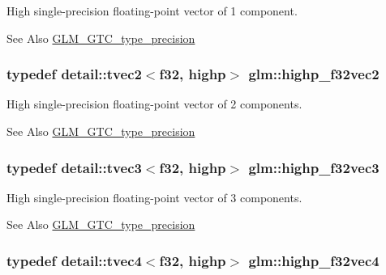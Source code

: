 High single-\/precision floating-\/point vector of 1 component. \begin{DoxySeeAlso}{See Also}
\hyperlink{group__gtc__type__precision}{G\-L\-M\-\_\-\-G\-T\-C\-\_\-type\-\_\-precision} 
\end{DoxySeeAlso}
\hypertarget{group__gtc__type__precision_gabba3e1b3ae0bcaa7aaac573c08c2f8d3}{
\subsubsection[{highp\-\_\-f32vec2}]{\setlength{\rightskip}{0pt plus 5cm}typedef detail\-::tvec2$<$f32, highp$>$ {\bf glm\-::highp\-\_\-f32vec2}}}\label{group__gtc__type__precision_gabba3e1b3ae0bcaa7aaac573c08c2f8d3}
High single-\/precision floating-\/point vector of 2 components. \begin{DoxySeeAlso}{See Also}
\hyperlink{group__gtc__type__precision}{G\-L\-M\-\_\-\-G\-T\-C\-\_\-type\-\_\-precision} 
\end{DoxySeeAlso}
\hypertarget{group__gtc__type__precision_ga581a4a4eb1f3a269d16af0c4e2d8daf4}{
\subsubsection[{highp\-\_\-f32vec3}]{\setlength{\rightskip}{0pt plus 5cm}typedef detail\-::tvec3$<$f32, highp$>$ {\bf glm\-::highp\-\_\-f32vec3}}}\label{group__gtc__type__precision_ga581a4a4eb1f3a269d16af0c4e2d8daf4}
High single-\/precision floating-\/point vector of 3 components. \begin{DoxySeeAlso}{See Also}
\hyperlink{group__gtc__type__precision}{G\-L\-M\-\_\-\-G\-T\-C\-\_\-type\-\_\-precision} 
\end{DoxySeeAlso}
\hypertarget{group__gtc__type__precision_ga53d3c1a17e2e6f26ee5ad1e8879d710e}{
\subsubsection[{highp\-\_\-f32vec4}]{\setlength{\rightskip}{0pt plus 5cm}typedef detail\-::tvec4$<$f32, highp$>$ {\bf glm\-::highp\-\_\-f32vec4}}}\label{group__gtc__type__precision_ga53d3c1a17e2e6f26ee5ad1e8879d710e}
